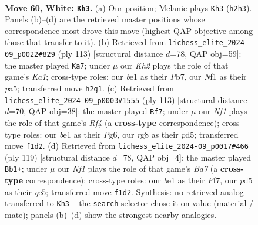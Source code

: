 \documentclass[11pt]{article}
\begin{document}
\clearpage

\begin{figure}[p]\centering
\begin{subfigure}{0.46\textwidth}\centering
\resizebox{\linewidth}{!}{%
\newchessgame
\chessboard[
  setfen={1r4r1/p5p1/4Q2p/1k1p3P/p2P2P1/4P3/1q5K/4bN2 w - - 28 60},
  showmover=false,
  pgfstyle=straightmove, color=movearrow, markmove={h2-h3}
]}
\caption{}
\end{subfigure}\hfill
\begin{subfigure}{0.46\textwidth}\centering
\resizebox{\linewidth}{!}{%
\newchessgame
\chessboard[
  setfen={k4Q2/1p6/p3p3/P2pP3/3P3p/4q2P/5RPK/8 b - - 2 57},
  showmover=false,
  pgfstyle=straightmove, color=movearrow, markmove={a8-a7}
]}
\caption{}
\end{subfigure}
\\[4pt]
\begin{subfigure}{0.46\textwidth}\centering
\resizebox{\linewidth}{!}{%
\newchessgame
\chessboard[
  setfen={8/4Q2k/3p2p1/2pP1r2/2P2q2/1P4pP/6P1/6RK b - - 4 57},
  showmover=false,
  pgfstyle=straightmove, color=movearrow, markmove={f5-f7}
]}
\caption{}
\end{subfigure}\hfill
\begin{subfigure}{0.46\textwidth}\centering
\resizebox{\linewidth}{!}{%
\newchessgame
\chessboard[
  setfen={1q4k1/5pp1/7p/p1Q5/p3K3/P5P1/bP3R1P/8 b - - 54 60},
  showmover=false,
  pgfstyle=straightmove, color=movearrow, markmove={a2-b1}
]}
\caption{}
\end{subfigure}
\caption{\textbf{Move 60, White: \texttt{Kh3}.} (a) Our position; Melanie plays \texttt{Kh3} (\texttt{h2h3}). Panels (b)--(d) are the retrieved master positions whose correspondence most drove this move (highest QAP objective among those that transfer to it). (b) Retrieved from \texttt{lichess\_elite\_2024-09\_p0022\#829} (ply 113) [structural distance $d$=78, QAP obj=59]: the master played \texttt{Ka7}; under $\mu$ our \emph{Kh2} plays the role of that game's \emph{Ka1}; cross-type roles: our \emph{b}e1 as their \emph{P}b7, our \emph{N}f1 as their \emph{p}a5; transferred move \texttt{h2g1}. (c) Retrieved from \texttt{lichess\_elite\_2024-09\_p0003\#1555} (ply 113) [structural distance $d$=70, QAP obj=38]: the master played \texttt{Rf7}; under $\mu$ our \emph{Nf1} plays the role of that game's \emph{Rf4} (a \textbf{cross-type} correspondence); cross-type roles: our \emph{b}e1 as their \emph{P}g6, our \emph{r}g8 as their \emph{p}d5; transferred move \texttt{f1d2}. (d) Retrieved from \texttt{lichess\_elite\_2024-09\_p0017\#466} (ply 119) [structural distance $d$=78, QAP obj=4]: the master played \texttt{Bb1+}; under $\mu$ our \emph{Nf1} plays the role of that game's \emph{Ba7} (a \textbf{cross-type} correspondence); cross-type roles: our \emph{b}e1 as their \emph{P}f7, our \emph{p}d5 as their \emph{q}c5; transferred move \texttt{f1d2}. Synthesis: no retrieved analog transferred to \texttt{Kh3} -- the \texttt{search} selector chose it on value (material / mate); panels (b)--(d) show the strongest nearby analogies.}
\label{fig:thought-m118}
\end{figure}
\end{document}
